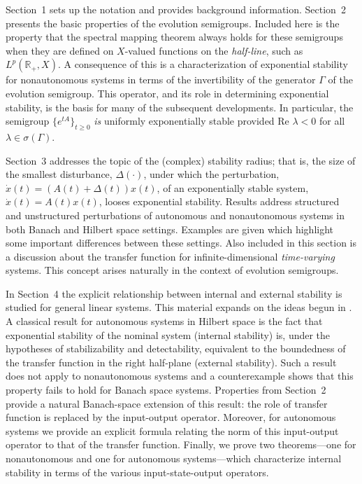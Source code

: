 \documentclass[10pt,psamsfonts,leqno]{siamltex}
\newcommand{\bbR}{\mathbb{R}}
\newcommand{\LpRp}{{L^p(\bbR_+,X)}}
\begin{document}
Section~1 sets up the notation and provides  background information.
Section~2 presents the basic properties of the evolution semigroups.
Included here is the property that the spectral mapping theorem always
holds for these semigroups when they are defined on $X$-valued functions
on the
{\em half-line}, such as $\LpRp$.  A consequence of this is a
characterization
of exponential stability for nonautonomous systems in terms of the
invertibility of the generator $\Gamma$ of the evolution semigroup.
This
operator, and its role in determining exponential stability, is the
basis for many of the subsequent developments. In particular, the
semigroup
$\{e^{tA}\}_{t\ge 0}$ {\em is} uniformly exponentially stable provided
$\text{Re }\lambda<0$ for all $\lambda\in\sigma(\Gamma)$.

Section~3 addresses the topic of the (complex) stability radius; that
is,
the size of the smallest disturbance, $\Delta(\cdot)$, under which the
perturbation, $\dot x(t)=(A(t)+\Delta(t))x(t)$, of an exponentially
stable system, $\dot x(t)=A(t)x(t)$, looses exponential  stability.
Results address structured and unstructured perturbations of autonomous
and nonautonomous systems in both Banach and Hilbert space settings.
Examples are given which highlight some important differences
between these settings.  Also included in this section is a
discussion about the transfer function for infinite-dimensional
{\em time-varying} systems.  This concept arises naturally in the
context of evolution semigroups.

In Section~4 the explicit relationship between internal and
external stability is studied for general linear systems.
This material  expands on the ideas begun in \cite{CDC}.
 A classical result for autonomous systems in
Hilbert space is the fact that  exponential stability of the nominal
system (internal stability) is, under the hypotheses of
stabilizability and detectability, equivalent to the boundedness of the
transfer function in the right half-plane (external stability). Such a
result does not apply to nonautonomous systems and a counterexample
shows
that this property fails to hold for Banach space systems.  Properties
from Section~2 provide a natural Banach-space extension of this result:
the role of transfer function is replaced by the input-output operator.
Moreover, for  autonomous systems we provide an explicit formula
relating the norm of this input-output operator to  that of the
transfer function.  Finally, we prove two theorems---one for
nonautonomous and one for autonomous systems---which characterize
internal stability in terms of the various input-state-output operators.
\end{document}

